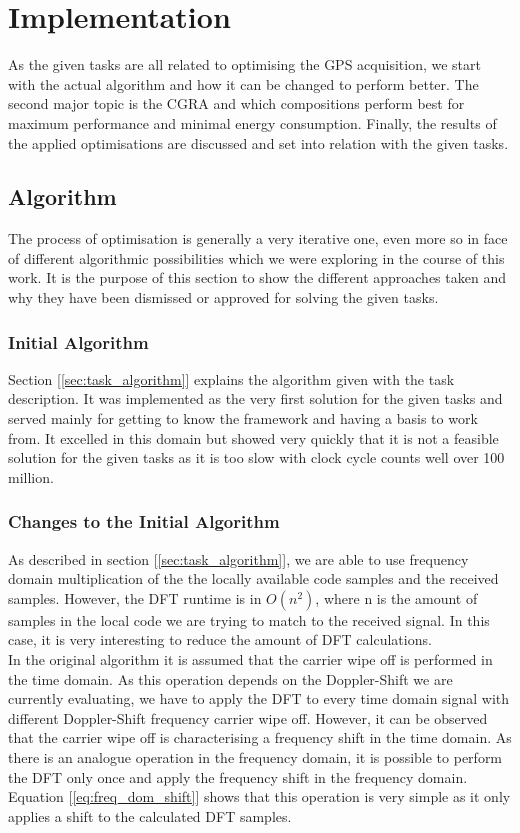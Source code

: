 \chapter{Implementation} %
\label{cha:impl}
	As the given tasks are all related to optimising the GPS acquisition, we start with the actual algorithm and how it can be changed to perform better. The second major topic is the CGRA and which compositions perform best for maximum performance and minimal energy consumption. Finally, the results of the applied optimisations are discussed and set into relation with the given tasks.

	\section{Algorithm} %
	\label{sec:impl_algorithmic_changes}
		The process of optimisation is generally a very iterative one, even more so in face of different algorithmic possibilities which we were exploring in the course of this work. It is the purpose of this section to show the different approaches taken and why they have been dismissed or approved for solving the given tasks.

		\subsection{Initial Algorithm} %
		\label{sub:initial_algorithm}
			Section [\ref{sec:task_algorithm}] explains the algorithm given with the task description. It was implemented as the very first solution for the given tasks and served mainly for getting to know the framework and having a basis to work from. It excelled in this domain but showed very quickly that it is not a feasible solution for the given tasks as it is too slow with clock cycle counts well over \num{100} million. 

		\subsection{Changes to the Initial Algorithm} %
		\label{sub:changes_to_the_initial_algorithm}
			As described in section [\ref{sec:task_algorithm}], we are able to use frequency domain multiplication of the the locally available code samples and the received samples. However, the DFT runtime is in $O(n^2)$, where n is the amount of samples in the local code we are trying to match to the received signal. In this case, it is very interesting to reduce the amount of DFT calculations.\\
			In the original algorithm it is assumed that the carrier wipe off is performed in the time domain. As this operation depends on the Doppler-Shift we are currently evaluating, we have to apply the DFT to every time domain signal with different Doppler-Shift frequency carrier wipe off. However, it can be observed that the carrier wipe off is characterising a frequency shift in the time domain. As there is an analogue operation in the frequency domain, it is possible to perform the DFT only once and apply the frequency shift in the frequency domain. Equation [\ref{eq:freq_dom_shift}] shows that this operation is very simple as it only applies a shift to the calculated DFT samples.

